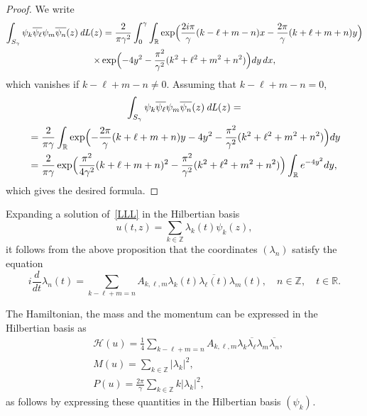 \documentclass[10pt]{amsart}
\DeclareMathOperator{\dL}{\mathit{dL}}
\theoremstyle{definition}
\let\e e
\let\EE\exp
\let\ov\overline
\newcommand\R{\mathbb R}
\newcommand\Z{\mathbb Z}
\begin{document}
\begin{proof} We write\vspace*{-3pt}
\begin{multline*}
\int_{S_{\gamma}} \psi_{k}\ov{\psi_{\ell}} \psi_{m}\ov{\psi_{n}}(z)\dL(z)
= \frac{2}{\pi \gamma^2}\int_{0}^{\gamma}\int_{\R}
\EE\Bigl(\frac{2i \pi}{\gamma}(k-\ell+m-n)x -\frac{2\pi}{\gamma}(k+\ell+m+n)y\Bigr)\\
\times \EE\Bigl(-4y^2-\frac{\pi^2}{\gamma^2}(k^2+\ell^2+m^2+n^2)\Bigr) dy \, dx,
\end{multline*}
which vanishes if $k-\ell+m-n \neq 0$. Assuming that $k-\ell+m-n =0$,\vspace*{-3pt}
\begin{multline*}
\int_{S_{\gamma}} \psi_{k}\ov{\psi_{\ell}} \psi_{m}\ov{\psi_{n}}(z)\dL(z)=\\
\begin{aligned}
&= \frac{2}{\pi \gamma} \int_{\R} \EE\Bigl(-\frac{2\pi}{\gamma}(k+\ell+m+n)y-4y^2-\frac{\pi^2}{\gamma^2}(k^2+\ell^2+m^2+n^2)\Bigr) dy\\
&= \frac{2}{\pi \gamma}\EE\Bigl(\frac{\pi^2}{4 \gamma^2}(k+\ell+m+n)^2-\frac{\pi^2}{\gamma^2}(k^2+\ell^2+m^2+n^2)\Bigr) \int_{\R} \e^{ -4y^2} dy,
\end{aligned}
\end{multline*}
which gives the desired formula.
\end{proof}

Expanding a solution of~\eqref{LLL} in the Hilbertian basis
\[
u(t,z) = \sum_{k \in \mathbb{Z}} \lambda_k(t) \psi_k(z),
\]
it follows from the above proposition that the coordinates $(\lambda_n)$ satisfy the equation
\begin{equation}\label{eq_lambda_k}
i\frac{d}{dt} \lambda_n(t) = \sum_{k - \ell + m = n} A_{k,\ell,m} \lambda_{k}(t) \ov{\lambda_{\ell}(t)} \lambda_{m}(t), \quad n \in \Z, \quad t\in \R.
\end{equation}

The Hamiltonian, the mass and the momentum can be expressed in the Hilbertian basis as\vspace*{-3pt}
\begin{align*}
& \mathcal{H}(u) = \frac14 \sum_{k - \ell + m = n} A_{k,\ell,m} \lambda_{k} \ov{\lambda_{\ell}} \lambda_{m} \ov{\lambda_{n}}, \\
& M(u) = \sum_{k \in \mathbb{Z}} | \lambda_k|^2, \\
& P(u) =\frac{2\pi}{\gamma} \sum_{k \in \mathbb{Z}} k | \lambda_k|^2,
\end{align*}
as follows by expressing these quantities in the Hilbertian basis $(\psi_k)_{}$. 
\end{document}
